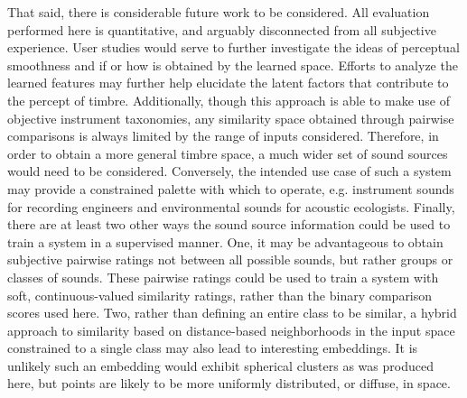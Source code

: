 That said, there is considerable future work to be considered.
All evaluation performed here is quantitative, and arguably disconnected from all subjective experience.
User studies would serve to further investigate the ideas of perceptual smoothness and if or how is obtained by the learned space.
Efforts to analyze the learned features may further help elucidate the latent factors that contribute to the percept of timbre.
Additionally, though this approach is able to make use of objective instrument taxonomies, any similarity space obtained through pairwise comparisons is always limited by the range of inputs considered.
Therefore, in order to obtain a more general timbre space, a much wider set of sound sources would need to be considered.
Conversely, the intended use case of such a system may provide a constrained palette with which to operate, e.g. instrument sounds for recording engineers and environmental sounds for acoustic ecologists.
Finally, there are at least two other ways the sound source information could be used to train a system in a supervised manner.
One, it may be advantageous to obtain subjective pairwise ratings not between all possible sounds, but rather groups or classes of sounds.
These pairwise ratings could be used to train a system with soft, continuous-valued similarity ratings, rather than the binary comparison scores used here.
Two, rather than defining an entire class to be similar, a hybrid approach to similarity based on distance-based neighborhoods in the input space constrained to a single class may also lead to interesting embeddings.
It is unlikely such an embedding would exhibit spherical clusters as was produced here, but points are likely to be more uniformly distributed, or diffuse, in space.
